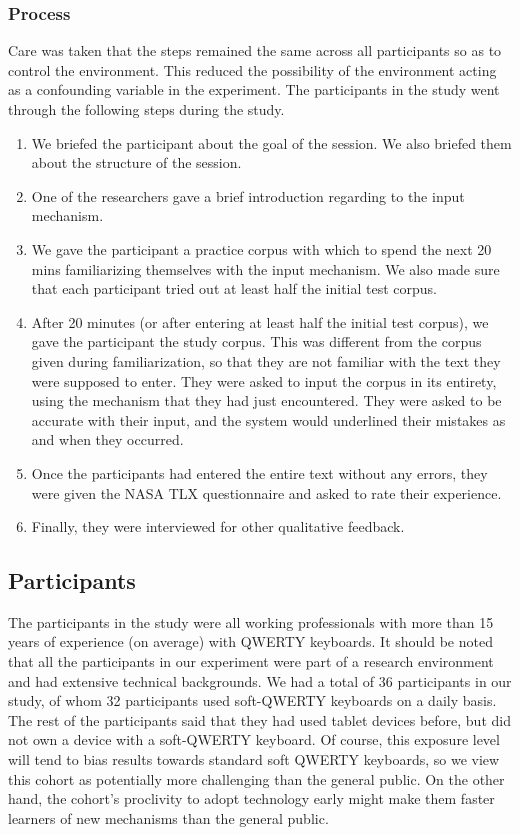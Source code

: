 \subsubsection{Process}

Care was taken that the steps remained the same across all
participants so as to control the environment. This reduced the
possibility of the environment acting as a confounding variable in the
experiment.  The participants in the study went through the following
steps during the study.

\begin{enumerate}
\item We briefed the participant about the goal of the session. We also
  briefed them about the structure of the session.
\item One of the researchers gave a brief introduction regarding to
  the input mechanism. 
\item We gave the participant a practice corpus with which to spend
  the next 20 mins familiarizing themselves with the input
  mechanism. We also made sure that each participant tried out at
  least half the initial test corpus.
\item After 20 minutes (or after entering at least half the initial
  test corpus), we gave the participant the study corpus. This was
  different from the corpus given during familiarization, so that they
  are not familiar with the text they were supposed to enter. They
  were asked to input the corpus in its entirety, using the mechanism
  that they had just encountered. They were asked to be accurate with
  their input, and the system would underlined their mistakes as and
  when they occurred.
\item Once the participants had entered the entire text without any
  errors, they were given the NASA TLX questionnaire and asked to
  rate their experience.
\item Finally, they were interviewed for other qualitative feedback.
\end{enumerate}

\subsection{Participants}

The participants in the study were all working professionals with more
than 15 years of experience (on average) with QWERTY keyboards. It
should be noted that all the participants in our experiment were part
of a research environment and had extensive technical backgrounds. We
had a total of 36 participants in our study, of whom 32 participants
used soft-QWERTY keyboards on a daily basis.  The rest of the
participants said that they had used tablet devices before, but did not own a
device with a soft-QWERTY keyboard.  Of course, this exposure level
will tend to bias results towards standard soft QWERTY keyboards, so
we view this cohort as potentially more challenging than the general
public.  On the other hand, the cohort's proclivity to adopt
technology early might make them faster learners of new mechanisms
than the general public.
	
